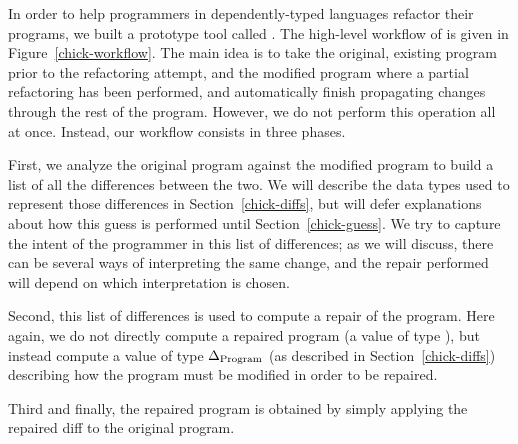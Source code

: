 In order to help programmers in dependently-typed languages refactor their
programs, we built a prototype tool called \Chick{}.  The high-level workflow of
\Chick{} is given in Figure~\ref{chick-workflow}.  The main idea is to take the
original, existing program prior to the refactoring attempt, and the modified
program where a partial refactoring has been performed, and automatically finish
propagating changes through the rest of the program.  However, we do not perform
this operation all at once.  Instead, our workflow consists in three phases.

First, we analyze the original program against the modified program to build a
list of all the differences between the two.  We will describe the data types
used to represent those differences in Section~\ref{chick-diffs}, but will defer
explanations about how this guess is performed until Section~\ref{chick-guess}.
We try to capture the intent of the programmer in this list of differences; as
we will discuss, there can be several ways of interpreting the same change, and
the repair performed will depend on which interpretation is chosen.

Second, this list of differences is used to compute a repair of the program.
Here again, we do not directly compute a repaired program (a value of type
), but instead compute a value of type $\Delta_{\normalfont \text{Program}}$ (as
described in Section~\ref{chick-diffs}) describing how the program must be
modified in order to be repaired.

Third and finally, the repaired program is obtained by simply applying the
repaired diff to the original program.

